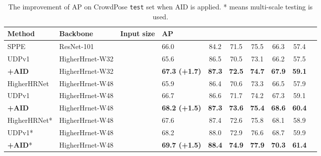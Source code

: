 \documentclass[final]{cvpr}
\begin{document}
\begin{table*}
\footnotesize
\begin{center}
\begin{tabular}{l|l|c|lcccccc}

\hline
Method                           & Backbone      &Input size             &AP                     &  &    &    &        & \\

\hline
SPPE \cite{Crowdpose}             & ResNet-101    &         &66.0                   & 84.2             & 71.5               & 75.5              &66.3                   &57.4\\
UDPv1 \cite{UDP}                  &HigherHrnet-W32&         &65.6                   & 86.5             & 70.5               & 73.1              &66.2                   &57.5\\
\textbf{+AID}                    &HigherHrnet-W32&         &\textbf{67.3 (+1.7)}    & \textbf{87.3}    &\textbf{72.5}       & \textbf{74.7}     &\textbf{67.9}          &\textbf{59.1}\\
HigherHRNet \cite{Higher}         &HigherHrnet-W48&         &65.9                   & 86.4             & 70.6               & 73.3              &66.5                   &57.9\\
UDPv1 \cite{UDP}                  &HigherHrnet-W48&         &66.7                   & 86.6             & 71.7               & 74.2              &67.3                   &59.1\\
\textbf{+AID}                    &HigherHrnet-W48&         &\textbf{68.2 (+1.5)}    & \textbf{87.3}    &\textbf{73.6}       & \textbf{75.4}     &\textbf{68.6}          &\textbf{60.4}\\
\hline
HigherHRNet* \cite{Higher}        &HigherHrnet-W48&         &67.6                   & 87.4             & 72.6               & 75.8              &68.1                   &58.9\\
UDPv1* \cite{UDP}                  &HigherHrnet-W48&         &68.2                   & 88.0             & 72.9               & 76.6              &68.7                   &59.9\\
\textbf{+AID}*                   &HigherHrnet-W48&         &\textbf{69.7 (+1.5)}    & \textbf{88.4}    &\textbf{74.9}       & \textbf{77.9}     &\textbf{70.3}          &\textbf{61.4}\\
\hline
\end{tabular}
\end{center}
\caption{The improvement of AP on CrowdPose \texttt{test} set when AID is applied. * means multi-scale testing is used.}
\label{tab:crowdpose}
\end{table*}
\end{document}
